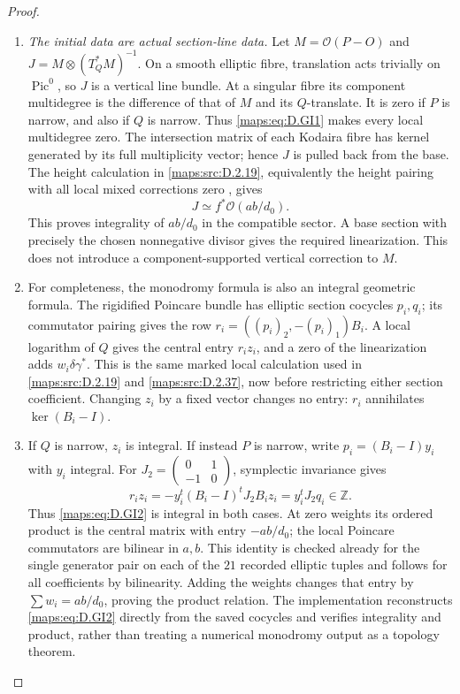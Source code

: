 \begin{proof}
\begin{enumerate}[label=\arabic*.,leftmargin=*]
\item \emph{The initial data are actual section-line data.}
Let $M=\mathcal O(P-O)$ and
$J=M\otimes(T_Q^*M)^{-1}$. On a smooth elliptic fibre,
translation acts trivially on $\operatorname{Pic}^0$, so
$J$ is a vertical line bundle. At a singular fibre its
component multidegree is the difference of that of $M$
and its $Q$-translate. It is zero if $P$ is narrow, and
also if $Q$ is narrow. Thus \eqref{maps:eq:D.GI1} makes every local
multidegree zero. The intersection matrix of each
Kodaira fibre has kernel generated by its full
multiplicity vector; hence $J$ is pulled back from the
base. The height calculation in \ref{maps:src:D.2.19}, equivalently
the height pairing with all local mixed corrections
zero \cite[Section 11.8]{manSS10}, gives
\[
                         J\simeq f^*\mathcal O(ab/d_0).
\]
This proves integrality of $ab/d_0$ in the compatible
sector. A base section with precisely the chosen
nonnegative divisor gives the required linearization.
This does not introduce a component-supported vertical
correction to $M$.

\item For completeness, the monodromy formula is also an
integral geometric formula. The rigidified Poincare
bundle has elliptic section cocycles $p_i,q_i$; its
commutator pairing gives the row
$r_i=((p_i)_2,-(p_i)_1)B_i$. A local logarithm of $Q$
gives the central entry $r_i z_i$, and a zero of the
linearization adds $w_i\delta\gamma^*$. This is the
same marked local calculation used in \ref{maps:src:D.2.19} and
\ref{maps:src:D.2.37}, now before restricting either section coefficient.
Changing $z_i$ by a fixed vector changes no entry:
$r_i$ annihilates $\ker(B_i-I)$.

\item If $Q$ is narrow, $z_i$ is integral. If instead $P$
is narrow, write $p_i=(B_i-I)y_i$ with $y_i$ integral.
For $J_2=\left(\begin{smallmatrix}0&1\\-1&0\end{smallmatrix}\right)$,
symplectic invariance gives
\[
 r_i z_i=-y_i^t(B_i-I)^tJ_2B_i z_i
                         =y_i^tJ_2q_i\in\mathbb Z.
\]
Thus \eqref{maps:eq:D.GI2} is integral in both cases. At zero weights
its ordered product is the central matrix with entry
$-ab/d_0$; the local Poincare commutators are bilinear
in $a,b$. This identity is checked already for the
single generator pair on each of the $21$ recorded
elliptic tuples and follows for all coefficients by
bilinearity. Adding the weights changes that entry by
$\sum w_i=ab/d_0$, proving the product relation.
The implementation reconstructs \eqref{maps:eq:D.GI2} directly from
the saved cocycles and verifies integrality and product,
rather than treating a numerical monodromy output as
a topology theorem.


\end{enumerate}
\end{proof}
